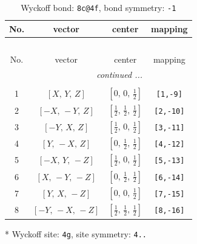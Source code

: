 \documentclass[fleqn,8pt]{jsarticle}
\begin{document}
\renewcommand{\arraystretch}{1.2}
\begin{longtable}{cccc}
\caption{Wyckoff bond: {\tt 8c@4f}, bond symmetry: {\tt -1}}
 \\
 \hline \hline
No. & vector & center & mapping \\ \hline \endfirsthead

\multicolumn{3}{l}{\tablename\ \thetable{}} \\
 \hline \hline
No. & vector & center & mapping \\ \hline \endhead

 \hline \hline
\multicolumn{3}{r}{\footnotesize\it continued ...} \\ \endfoot

 \hline \hline
\multicolumn{3}{r}{} \\ \endlastfoot

1 & $\left[ X,\, Y,\, Z \right]$ & $\left[ 0,\, 0,\, \frac{1}{2} \right]$ & {\tt [1,-9]} \\ \hline
2 & $\left[ - X,\, - Y,\, Z \right]$ & $\left[ \frac{1}{2},\, \frac{1}{2},\, \frac{1}{2} \right]$ & {\tt [2,-10]} \\ \hline
3 & $\left[ - Y,\, X,\, Z \right]$ & $\left[ \frac{1}{2},\, 0,\, \frac{1}{2} \right]$ & {\tt [3,-11]} \\ \hline
4 & $\left[ Y,\, - X,\, Z \right]$ & $\left[ 0,\, \frac{1}{2},\, \frac{1}{2} \right]$ & {\tt [4,-12]} \\ \hline
5 & $\left[ - X,\, Y,\, - Z \right]$ & $\left[ \frac{1}{2},\, 0,\, \frac{1}{2} \right]$ & {\tt [5,-13]} \\ \hline
6 & $\left[ X,\, - Y,\, - Z \right]$ & $\left[ 0,\, \frac{1}{2},\, \frac{1}{2} \right]$ & {\tt [6,-14]} \\ \hline
7 & $\left[ Y,\, X,\, - Z \right]$ & $\left[ 0,\, 0,\, \frac{1}{2} \right]$ & {\tt [7,-15]} \\ \hline
8 & $\left[ - Y,\, - X,\, - Z \right]$ & $\left[ \frac{1}{2},\, \frac{1}{2},\, \frac{1}{2} \right]$ & {\tt [8,-16]} \\
\end{longtable}
* Wyckoff site: {\tt 4g}, site symmetry: {\tt 4..}
\renewcommand{\arraystretch}{1.2}
\end{document}
